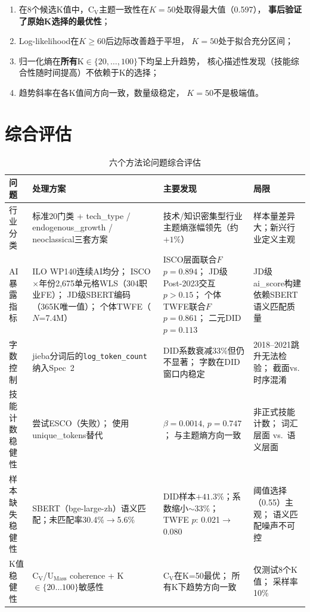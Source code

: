 \documentclass[12pt,a4paper]{ctexart}
\begin{document}
\begin{enumerate}
\item 在8个候选K值中，C$_\text{V}$主题一致性在$K=50$处取得最大值（0.597），
      \textbf{事后验证了原始K选择的最优性}；
\item Log-likelihood在$K \geq 60$后边际改善趋于平坦，
      $K=50$处于拟合充分区间；
\item 归一化熵在\textbf{所有}K$\in\{20,\ldots,100\}$下均呈上升趋势，
      核心描述性发现（技能综合性随时间提高）不依赖于K的选择；
\item 趋势斜率在各K值间方向一致，数量级稳定，
      $K=50$不是极端值。
\end{enumerate}


\section{综合评估}
\label{sec:summary}

\begin{table}[h!]
\centering
\caption{六个方法论问题综合评估}
\label{tab:summary}
\small
\begin{tabular}{p{2.2cm}p{3.8cm}p{4cm}p{3cm}}
\toprule
问题 & 处理方案 & 主要发现 & 局限 \\
\midrule
行业分类 &
标准20门类 + tech\_type / endogenous\_growth / neoclassical三套方案 &
技术/知识密集型行业主题熵涨幅领先（约$+1\%$） &
样本量差异大；新兴行业定义主观 \\[6pt]

AI暴露指标 &
ILO WP140连续AI均分；
ISCO$\times$年份2,675单元格WLS（304职业FE）；
JD级SBERT编码（365K唯一值）；
个体TWFE（$N$=7.4M） &
ISCO层面联合$F$ $p=0.894$；
JD级Post-2023交互$p>0.15$；
个体TWFE联合$F$ $p=0.861$；
二元DID $p=0.113$ &
JD级ai\_score构建依赖SBERT语义匹配质量 \\[6pt]

字数控制 &
jieba分词后的\texttt{log\_token\_count}纳入Spec~2 &
DID系数衰减33\%但仍不显著；
字数在DID窗口内稳定 &
2018--2021跳升无法检验；
截面vs.时序混淆 \\[6pt]

技能计数稳健性 &
尝试ESCO（失败）；
使用unique\_tokens替代 &
$\beta=0.0014$, $p=0.747$；
与主题熵方向一致 &
非正式技能计数；
词汇层面 vs.\ 语义层面 \\[6pt]

样本缺失稳健性 &
SBERT（bge-large-zh）语义匹配；未匹配率30.4\%$\to$5.6\% &
DID样本$+41.3\%$；系数缩小$\sim$33\%；
TWFE $p$: 0.021$\to$0.080 &
阈值选择（0.55）主观；
语义匹配噪声不可控 \\[6pt]

K值稳健性 &
C$_\text{V}$/U$_\text{Mass}$ coherence +
K$\in\{20\ldots100\}$敏感性 &
C$_\text{V}$在K=50最优；
所有K下趋势方向一致 &
仅测试8个K值；
采样率10\% \\
\bottomrule
\end{tabular}
\end{table}
\end{document}
